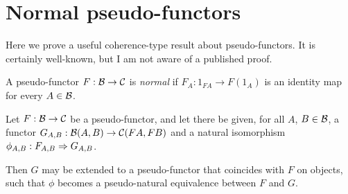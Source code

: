 \section{Normal pseudo-functors}
Here we prove a useful coherence-type result about pseudo-functors.
It is certainly well-known, but I am not aware of a published proof.%
\begin{definition} %
	A pseudo-functor $F:\mathcal{B}\to\mathcal{C}$ is \emph{normal} if
	$F_A: 1_{FA}\to F(1_A)$ is an identity map for every $A\in\mathcal{B}$.
\end{definition}
\begin{lemma}\label{l-normal}
	Let $F:\mathcal{B}\to\mathcal{C}$ be a pseudo-functor, and let there be given,
	for all $A$, $B\in\mathcal{B}$, a functor $G_{A,B}: \mathcal{B}(A,B)\to\mathcal{C}(FA,FB)$
	and a natural isomorphism $\phi_{A,B}: F_{A,B}\Rightarrow G_{A,B}$.
	
	Then $G$ may be extended to a pseudo-functor that coincides
	with $F$ on objects, such that $\phi$ becomes a pseudo-natural
	equivalence between $F$ and $G$.
\end{lemma}
